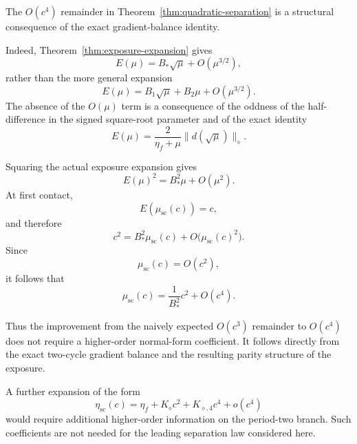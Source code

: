 The $O(c^4)$ remainder in
Theorem~\ref{thm:quadratic-separation}
is a structural consequence of the exact gradient-balance
identity.

Indeed, Theorem~\ref{thm:exposure-expansion} gives
\[
E(\mu)
=
B_*\sqrt{\mu}
+
O(\mu^{3/2}),
\]
rather than the more general expansion
\[
E(\mu)
=
B_1\sqrt{\mu}
+
B_2\mu
+
O(\mu^{3/2}).
\]
The absence of the $O(\mu)$ term is a consequence of the
oddness of the half-difference in the signed square-root
parameter and of the exact identity
\[
E(\mu)
=
\frac{2}{\eta_f+\mu}
\|d(\sqrt{\mu})\|_\diamond .
\]

Squaring the actual exposure expansion gives
\[
E(\mu)^2
=
B_*^2\mu
+
O(\mu^2).
\]
At first contact,
\[
E(\mu_{\mathrm{sc}}(c))=c,
\]
and therefore
\[
c^2
=
B_*^2\mu_{\mathrm{sc}}(c)
+
O\bigl(\mu_{\mathrm{sc}}(c)^2\bigr).
\]
Since
\[
\mu_{\mathrm{sc}}(c)=O(c^2),
\]
it follows that
\[
\mu_{\mathrm{sc}}(c)
=
\frac{1}{B_*^2}c^2
+
O(c^4).
\]

Thus the improvement from the naively expected $O(c^3)$
remainder to $O(c^4)$ does not require a higher-order normal-form
coefficient. It follows directly from the exact two-cycle
gradient balance and the resulting parity structure of the
exposure.

A further expansion of the form
\[
\eta_{\mathrm{sc}}(c)
=
\eta_f
+
K_\diamond c^2
+
K_{\diamond,4}c^4
+
o(c^4)
\]
would require additional higher-order information on the
period-two branch. Such coefficients are not needed for the
leading separation law considered here.